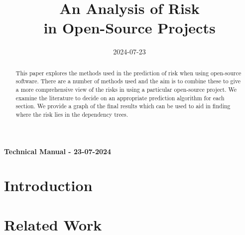 \documentclass[10pt, onecolumn]{IEEEtran}
\begin{document}
\title{An Analysis of Risk\\ in Open-Source Projects}

\author{
\and
{}}


\maketitle

\date{2024-07-23}


\begin{description}
    \item[]
    \begin{center}
        \item[\textbf{Technical Manual - 23-07-2024}] 
        \end{center}
    \item[]
\end{description}



\begin{abstract}
\begin{addmargin}[4em]{4em}
This paper explores the methods used in the prediction of risk when using open-source software. There are a number of methods used and the aim is to combine these to give a more comprehensive view of the risks in using a particular open-source project. We examine the literature to decide on an appropriate prediction algorithm for each section. We provide a graph of the final results which can be used to aid in finding where the risk lies in the dependency trees. 
\end{addmargin}
\end{abstract}


\section{Introduction}


\section{Related Work}
\end{document}
